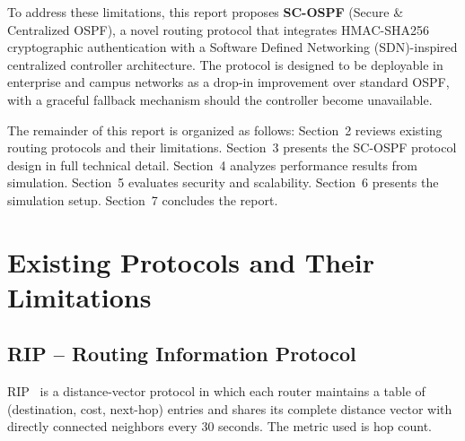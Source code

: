 \documentclass[12pt,a4paper]{article}
\begin{document}
To address these limitations, this report proposes \textbf{SC-OSPF} (Secure \&
Centralized OSPF), a novel routing protocol that integrates HMAC-SHA256
cryptographic authentication with a Software Defined Networking (SDN)-inspired
centralized controller architecture. The protocol is designed to be deployable
in enterprise and campus networks as a drop-in improvement over standard OSPF,
with a graceful fallback mechanism should the controller become unavailable.

The remainder of this report is organized as follows: Section~2 reviews existing
routing protocols and their limitations. Section~3 presents the SC-OSPF protocol
design in full technical detail. Section~4 analyzes performance results from
simulation. Section~5 evaluates security and scalability. Section~6 presents the
simulation setup. Section~7 concludes the report.

\section{Existing Protocols and Their Limitations}

\subsection{RIP -- Routing Information Protocol}

RIP~\cite{rfc1058,rfc2453} is a distance-vector protocol in which each router
maintains a table of (destination, cost, next-hop) entries and shares its
complete distance vector with directly connected neighbors every 30 seconds.
The metric used is hop count.
\end{document}
